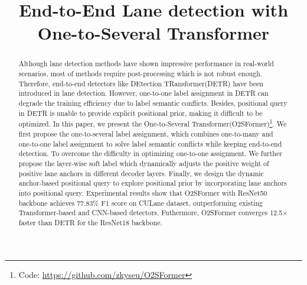 \documentclass{bmvc2k}
\title{End-to-End Lane detection with One-to-Several Transformer}
\begin{document}
\maketitle

\vspace{-0.7cm}

\begin{abstract}
   Although lane detection methods have shown impressive performance in real-world scenarios, 
   most of methods require post-processing which is not robust enough. 
   Therefore, end-to-end detectors like DEtection TRansformer(DETR) have been introduced in lane detection. 
   However, one-to-one label assignment in DETR can degrade the training efficiency due to label semantic conflicts.   
   Besides, positional query in DETR is unable to provide explicit positional prior, 
   making it difficult to be optimized. In this paper, we present the One-to-Several Transformer(O2SFormer)\footnote{\noindent Code: \href{https://github.com/zkyseu/O2SFormer}{https://github.com/zkyseu/O2SFormer}}. 
   We first propose the one-to-several label assignment, which combines one-to-many and one-to-one label assignment to 
   solve label semantic conflicts while keeping end-to-end detection. To overcome the difficulty in 
   optimizing one-to-one assignment. We further propose the layer-wise soft label 
   which dynamically adjusts the positive weight of positive lane anchors in different decoder layers. 
   Finally, we design the dynamic anchor-based positional query to explore positional prior 
   by incorporating lane anchors into positional query. Experimental results show that O2SFormer with ResNet50 backbone achieves 77.83\% F1 score on CULane dataset, 
   outperforming existing Transformer-based and CNN-based detectors. Futhermore, O2SFormer converges 12.5× faster than DETR for the ResNet18 backbone. 
\vspace{-0.44cm}
\end{abstract}
\end{document}
